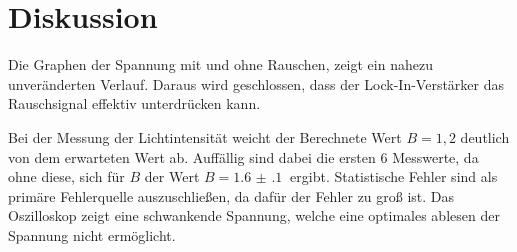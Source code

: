 \section{Diskussion}
\label{sec:Diskussion}




Die Graphen der Spannung mit und ohne Rauschen, zeigt ein nahezu unveränderten Verlauf. Daraus wird geschlossen, dass der
Lock-In-Verstärker das Rauschsignal effektiv unterdrücken kann.

Bei der Messung der Lichtintensität weicht der Berechnete Wert $B=1,2$ deutlich von dem erwarteten Wert ab. Auffällig sind dabei
die ersten 6 Messwerte, da ohne diese, sich für $B$ der Wert $B= \SI{1.6(1)}{}$ ergibt. Statistische Fehler sind
als primäre Fehlerquelle auszuschließen, da dafür der Fehler zu groß ist. Das Oszilloskop zeigt eine schwankende Spannung, welche
eine optimales ablesen der Spannung nicht ermöglicht.
